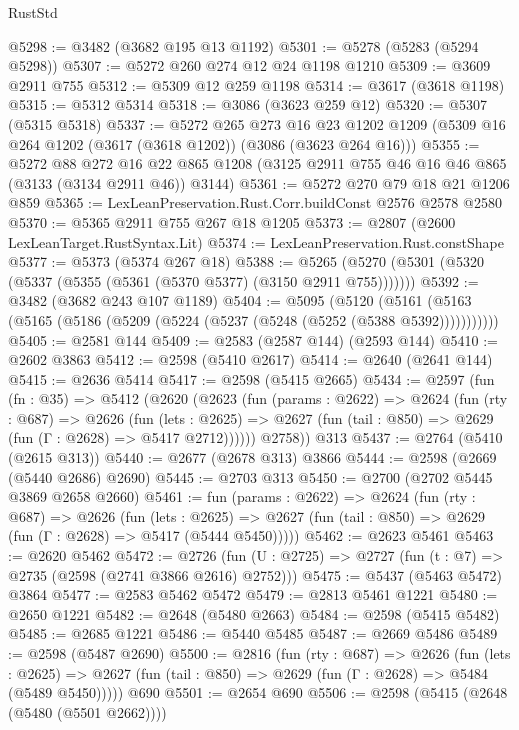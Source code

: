 \begin{lexlean}{RustStd}
\begin{coremodule}
@5298 := @3482 (@3682 @195 @13 @1192)
@5301 := @5278 (@5283 (@5294 @5298))
@5307 := @5272 @260 @274 @12 @24 @1198 @1210
@5309 := @3609 @2911 @755
@5312 := @5309 @12 @259 @1198
@5314 := @3617 (@3618 @1198)
@5315 := @5312 @5314
@5318 := @3086 (@3623 @259 @12)
@5320 := @5307 (@5315 @5318)
@5337 := @5272
    @265
    @273
    @16
    @23
    @1202
    @1209
    (@5309 @16 @264 @1202 (@3617 (@3618 @1202)) (@3086 (@3623 @264 @16)))
@5355 := @5272
    @88
    @272
    @16
    @22
    @865
    @1208
    (@3125 @2911 @755 @46 @16 @46 @865 (@3133 (@3134 @2911 @46)) @3144)
@5361 := @5272 @270 @79 @18 @21 @1206 @859
@5365 := LexLeanPreservation.Rust.Corr.buildConst @2576 @2578 @2580
@5370 := @5365 @2911 @755 @267 @18 @1205
@5373 := @2807 (@2600 LexLeanTarget.RustSyntax.Lit)
@5374 := LexLeanPreservation.Rust.constShape
@5377 := @5373 (@5374 @267 @18)
@5388 := @5265 (@5270 (@5301 (@5320 (@5337 (@5355 (@5361 (@5370 @5377) (@3150 @2911 @755)))))))
@5392 := @3482 (@3682 @243 @107 @1189)
@5404 := @5095
    (@5120 (@5161 (@5163 (@5165 (@5186 (@5209 (@5224 (@5237 (@5248 (@5252 (@5388 @5392)))))))))))
@5405 := @2581 @144
@5409 := @2583 (@2587 @144) (@2593 @144)
@5410 := @2602 @3863
@5412 := @2598 (@5410 @2617)
@5414 := @2640 (@2641 @144)
@5415 := @2636 @5414
@5417 := @2598 (@5415 @2665)
@5434 := @2597
    (fun (fn : @35) =>
    @5412
      (@2620
        (@2623
          (fun (params : @2622) =>
          @2624
            (fun (rty : @687) =>
            @2626
              (fun (lets : @2625) =>
              @2627 (fun (tail : @850) => @2629 (fun (Γ : @2628) => @5417 @2712))))))
        @2758))
    @313
@5437 := @2764 (@5410 (@2615 @313))
@5440 := @2677 (@2678 @313) @3866
@5444 := @2598 (@2669 (@5440 @2686) @2690)
@5445 := @2703 @313
@5450 := @2700 (@2702 @5445 @3869 @2658 @2660)
@5461 := fun (params : @2622) =>
  @2624
    (fun (rty : @687) =>
    @2626
      (fun (lets : @2625) =>
      @2627 (fun (tail : @850) => @2629 (fun (Γ : @2628) => @5417 (@5444 @5450)))))
@5462 := @2623 @5461
@5463 := @2620 @5462
@5472 := @2726 (fun (U : @2725) => @2727 (fun (t : @7) => @2735 (@2598 (@2741 @3866 @2616) @2752)))
@5475 := @5437 (@5463 @5472) @3864
@5477 := @2583 @5462 @5472
@5479 := @2813 @5461 @1221
@5480 := @2650 @1221
@5482 := @2648 (@5480 @2663)
@5484 := @2598 (@5415 @5482)
@5485 := @2685 @1221
@5486 := @5440 @5485
@5487 := @2669 @5486
@5489 := @2598 (@5487 @2690)
@5500 := @2816
    (fun (rty : @687) =>
    @2626
      (fun (lets : @2625) =>
      @2627 (fun (tail : @850) => @2629 (fun (Γ : @2628) => @5484 (@5489 @5450)))))
    @690
@5501 := @2654 @690
@5506 := @2598 (@5415 (@2648 (@5480 (@5501 @2662))))

\end{coremodule}
\end{lexlean}
